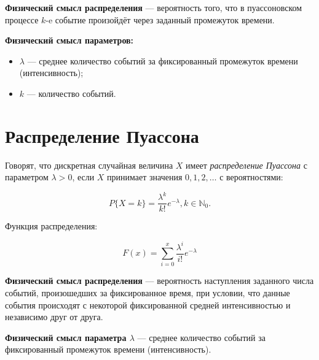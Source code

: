 \textbf{Физический смысл распределения} --- вероятность того, что в пуассоновском процессе $k$-e событие произойдёт через заданный промежуток времени.

\textbf{Физический смысл параметров:}

\begin{itemize}
	\item  $\lambda$ --- среднее количество событий за фиксированный промежуток времени (интенсивность);
	
	\item $k$ --- количество событий.
\end{itemize}




\chapter{Распределение Пуассона} %

Говорят, что  дискретная случайная величина $X$ имеет \textit{распределение Пуассона} с параметром $\lambda > 0$, если $X$ принимает значения $0, 1, 2, \dots$ с вероятностями:

\begin{equation}
	P\{X=k\} = \frac{\lambda^k}{k!} e^{-\lambda}, k \in \mathbb{N}_0.
\end{equation}

Функция распределения: 

\begin{equation}
	F(x) = \sum\limits_{i = 0}^{x} \frac{\lambda^i}{i!} e^{-\lambda}
\end{equation}

\textbf{Физический смысл распределения} --- вероятность наступления заданного числа событий, произошедших за фиксированное время, при условии, что данные события происходят с некоторой фиксированной средней интенсивностью и независимо друг от друга.

\textbf{Физический смысл параметра $\lambda$} --- среднее количество событий за фиксированный промежуток времени (интенсивность).

